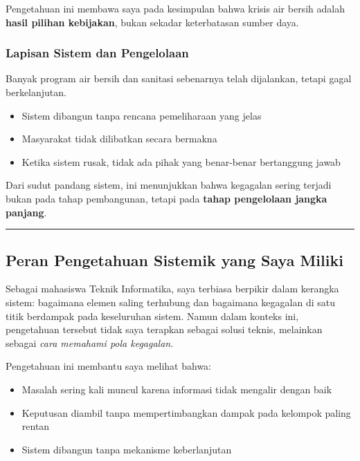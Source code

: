 \documentclass[
  letterpaper,
  DIV=11,
  numbers=noendperiod]{scrreprt}
\providecommand{\tightlist}{%
  \setlength{\itemsep}{0pt}\setlength{\parskip}{0pt}}
\begin{document}
Pengetahuan ini membawa saya pada kesimpulan bahwa krisis air bersih
adalah \textbf{hasil pilihan kebijakan}, bukan sekadar keterbatasan
sumber daya.

\subsubsection{Lapisan Sistem dan
Pengelolaan}\label{lapisan-sistem-dan-pengelolaan}

Banyak program air bersih dan sanitasi sebenarnya telah dijalankan,
tetapi gagal berkelanjutan.

\begin{itemize}
\tightlist
\item
  Sistem dibangun tanpa rencana pemeliharaan yang jelas
\item
  Masyarakat tidak dilibatkan secara bermakna
\item
  Ketika sistem rusak, tidak ada pihak yang benar-benar bertanggung
  jawab
\end{itemize}

Dari sudut pandang sistem, ini menunjukkan bahwa kegagalan sering
terjadi bukan pada tahap pembangunan, tetapi pada \textbf{tahap
pengelolaan jangka panjang}.

\begin{center}\rule{0.5\linewidth}{0.5pt}\end{center}

\subsection{Peran Pengetahuan Sistemik yang Saya
Miliki}\label{peran-pengetahuan-sistemik-yang-saya-miliki}

Sebagai mahasiswa Teknik Informatika, saya terbiasa berpikir dalam
kerangka sistem: bagaimana elemen saling terhubung dan bagaimana
kegagalan di satu titik berdampak pada keseluruhan sistem. Namun dalam
konteks ini, pengetahuan tersebut tidak saya terapkan sebagai solusi
teknis, melainkan sebagai \emph{cara memahami pola kegagalan}.

Pengetahuan ini membantu saya melihat bahwa:

\begin{itemize}
\tightlist
\item
  Masalah sering kali muncul karena informasi tidak mengalir dengan baik
\item
  Keputusan diambil tanpa mempertimbangkan dampak pada kelompok paling
  rentan
\item
  Sistem dibangun tanpa mekanisme keberlanjutan
\end{itemize}
\end{document}
